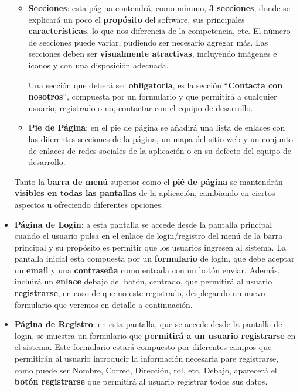 \begin{appendices}
\begin{itemize}
\begin{itemize}
		\item \textbf{Secciones}: esta página contendrá, como mínimo, \textbf{3 secciones}, donde se explicará un poco el \textbf{propósito} del software, sus principales \textbf{características}, lo que nos diferencia de la competencia, etc. El número de secciones puede variar, pudiendo ser necesario agregar más.  Las secciones deben ser \textbf{visualmente atractivas}, incluyendo imágenes e iconos y con una disposición adecuada. 
		
		Una sección que deberá ser \textbf{obligatoria}, es la sección ``\textbf{Contacta con nosotros}'', compuesta por un formulario y que permitirá a cualquier usuario, registrado o no, contactar con el equipo de desarrollo.
		
		\item \textbf{Pie de Página}: en el pie de página se añadirá una lista de enlaces con las diferentes secciones de la página, un mapa del sitio web y un conjunto de enlaces de redes sociales de la aplicación o en su defecto del equipo de desarrollo.
	\end{itemize}
	
	Tanto la \textbf{barra de menú} superior como el \textbf{pié de página} se mantendrán \textbf{visibles en todas las pantallas} de la aplicación, cambiando en ciertos aspectos u ofreciendo diferentes opciones.
	
	\item \textbf{Página de Login}: a esta pantalla se accede desde la pantalla principal cuando el usuario pulsa en el enlace de login/registro del menú de la barra principal y su propósito es permitir que los usuarios ingresen al sistema. La pantalla inicial esta compuesta por un \textbf{formulario} de login, que debe aceptar un \textbf{email} y una \textbf{contraseña} como entrada con un botón enviar. Además, incluirá un \textbf{enlace} debajo del botón, centrado, que permitirá al usuario \textbf{registrarse}, en caso de que no este registrado, desplegando un nuevo formulario que veremos en detalle a continuación.
	
	\item \textbf{Página de Registro}: en esta pantalla, que se accede desde la pantalla de login, se muestra un formulario que \textbf{permitirá a un usuario registrarse} en el sistema. Este formulario estará compuesto por diferentes campos que permitirán al usuario introducir la información necesaria pare registrarse, como puede ser Nombre, Correo, Dirección, rol, etc. Debajo, aparecerá el \textbf{botón registrarse} que permitirá al usuario registrar todos sus datos.  
	

\end{itemize}
\end{appendices}
